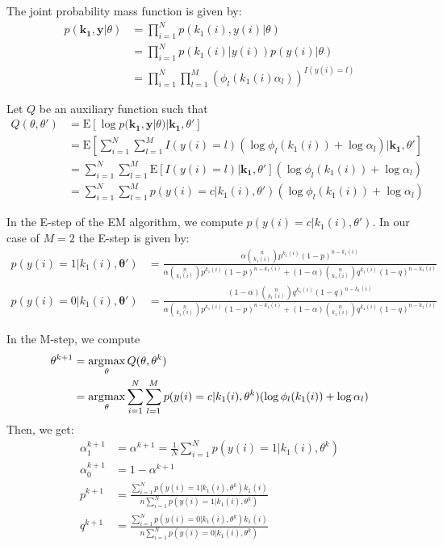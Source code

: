 The joint probability mass function is given by:
\begin{align*}
p(\mathbf{k_1}, \mathbf{y} | \theta ) &= \prod_{i=1}^{N} p(k_1(i), y(i) | \theta ) \\
&= \prod_{i=1}^{N} p(k_1(i) | y(i) ) p(y(i) | \theta )  \\
&= \prod_{i=1}^{N} \prod_{l=1}^{M} (\phi_l(k_1(i) \alpha_l)) ^ {I(y(i)=l)}
\end{align*}

Let $Q$ be an auxiliary function such that
\begin{align*}
Q(\theta, \theta') &= \mathrm{E} \left[ \log p(\mathbf{k_1}, \mathbf{y} | \theta ) | \mathbf{k_1}, \theta' \right] \\
&= \mathrm{E} \left[ \sum_{i=1}^{N} \sum_{l=1}^{M} I(y(i)=l) (\log \phi_l(k_1(i)) + \log \alpha_l) | \mathbf{k_1}, \theta' \right] \\
&= \sum_{i=1}^{N} \sum_{l=1}^{M} \mathrm{E} \left[ I(y(i)=l) | \mathbf{k_1}, \theta' \right] (\log \phi_l(k_1(i)) + \log \alpha_l)  \\
&= \sum_{i=1}^{N} \sum_{l=1}^{M} p(y(i) = c | k_1(i), \theta') (\log \phi_l(k_1(i)) + \log \alpha_l)
\end{align*}

In the E-step of the EM algorithm, we compute $p(y(i) = c | k_1(i), \theta')$. 
In our case of $M=2$ the E-step is given by:
\begin{align*}
p(y(i) = 1 | k_1(i), \mathbf{\theta'}) &= \frac{\alpha \binom{n}{k_1(i)} p^{k_1(i)} (1-p)^{n-k_1(i)}}{\alpha \binom{n}{k_1(i)} p^{k_1(i)} (1-p)^{n-k_1(i)} + (1-\alpha) \binom{n}{k_1(i)} q^{k_1(i)} (1-q)^{n-k_1(i)}} \\
p(y(i) = 0 | k_1(i), \mathbf{\theta'}) &= \frac{(1-\alpha) \binom{n}{k_1(i)} q^{k_1(i)} (1-q)^{n-k_1(i)}}{\alpha \binom{n}{k_1(i)} p^{k_1(i)} (1-p)^{n-k_1(i)} + (1-\alpha) \binom{n}{k_1(i)} q^{k_1(i)} (1-q)^{n-k_1(i)}}
\end{align*}

In the M-step, we compute
\begin{align*}
\theta^{k+1} &= \operatorname*{\arg\!\max}_\theta Q(\theta, \theta^{k}) \\
&= \operatorname*{\arg\!\max}_\theta \sum_{i=1}^{N} \sum_{l=1}^{M} p(y(i) = c | k_1(i), \theta^{k}) (\log \phi_l(k_1(i)) + \log \alpha_l)
\end{align*}
Then, we get:
\begin{align*}
\alpha_1^{k+1} &= \alpha^{k+1} = \frac{1}{N} \sum_{i=1}^{N} p(y(i) = 1 | k_1(i), \theta^{k}) \\
\alpha_0^{k+1} &= 1 - \alpha^{k+1} \\
p^{k+1} &= \frac{\sum_{i=1}^{N} p(y(i) = 1 | k_1(i), \theta^{k}) k_1(i)}{n \sum_{i=1}^{N} p(y(i) = 1 | k_1(i), \theta^{k})} \\
q^{k+1} &= \frac{\sum_{i=1}^{N} p(y(i) = 0 | k_1(i), \theta^{k}) k_1(i)}{n \sum_{i=1}^{N} p(y(i) = 0 | k_1(i), \theta^{k})}
\end{align*}


